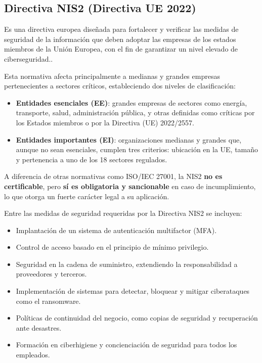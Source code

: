 \documentclass[a4paper, 11pt]{article}
\begin{document}
\subsection*{Directiva NIS2 (Directiva UE 2022)}

Es una directiva europea diseñada para fortalecer y verificar las medidas de seguridad de la información que deben adoptar las empresas de los estados miembros de la Unión Europea, con el fin de garantizar un nivel elevado de ciberseguridad.\cite{nis2}.

Esta normativa afecta principalmente a medianas y grandes empresas pertenecientes a sectores críticos, estableciendo dos niveles de clasificación:
\begin{itemize}
\item \textbf{Entidades esenciales (EE)}: grandes empresas de sectores como energía, transporte, salud, administración pública, y otras definidas como críticas por los Estados miembros o por la Directiva (UE) 2022/2557.
\item \textbf{Entidades importantes (EI)}: organizaciones medianas y grandes que, aunque no sean esenciales, cumplen tres criterios: ubicación en la UE, tamaño y pertenencia a uno de los 18 sectores regulados.
\end{itemize}

A diferencia de otras normativas como ISO/IEC 27001, la NIS2 \textbf{no es certificable}, pero \textbf{sí es obligatoria y sancionable} en caso de incumplimiento, lo que otorga un fuerte carácter legal a su aplicación.

Entre las medidas de seguridad requeridas por la Directiva NIS2 se incluyen:
\begin{itemize}
\item Implantación de un sistema de autenticación multifactor (MFA).
\item Control de acceso basado en el principio de mínimo privilegio.
\item Seguridad en la cadena de suministro, extendiendo la responsabilidad a proveedores y terceros.
\item Implementación de sistemas para detectar, bloquear y mitigar ciberataques como el ransomware.
\item Políticas de continuidad del negocio, como copias de seguridad y recuperación ante desastres.
\item Formación en ciberhigiene y concienciación de seguridad para todos los empleados.
\end{itemize}
\end{document}
